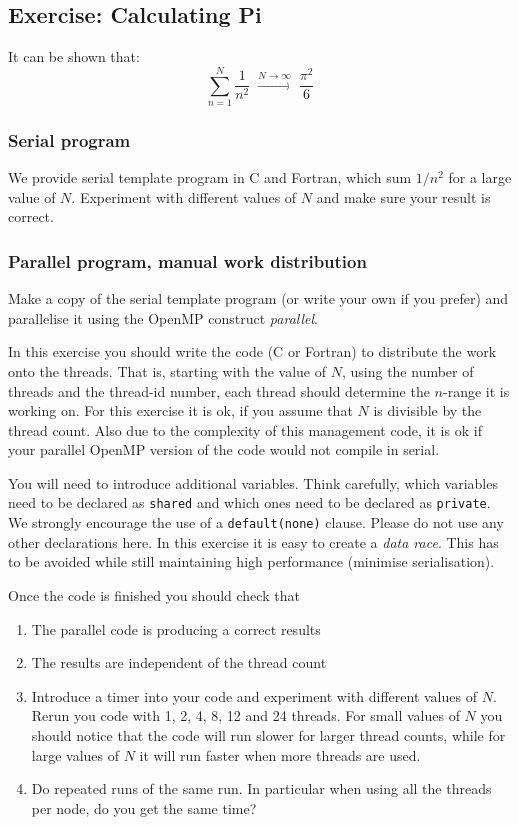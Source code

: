 \subsection{Exercise: Calculating Pi} \label{calcPiAtomicExercise}
It can be shown that:
\begin{equation}
\sum_{n=1}^N \frac{1}{n^2} \;\stackrel{N \to \infty}{\longrightarrow}
\;\frac{\pi^2}{6}
\end{equation}

\subsubsection{Serial program}
We provide serial template program in C and Fortran, which sum $1/n^2$ for a large value of $N$.  Experiment with different values of $N$ and make sure your result is correct.

\subsubsection{Parallel program, manual work distribution}\label{PiManual}
Make a copy of the serial template program (or write your own if you prefer) and parallelise it using the OpenMP construct \textit{parallel}.  

In this exercise you should write the code (C or Fortran) to distribute the work onto the threads. That is, starting with the value of $N$, using the number of threads and the thread-id number, each thread should determine the $n$-range it is working on.  For this exercise it is ok, if you assume that $N$ is divisible by the thread count.  Also due to the complexity of this management code, it is ok if your parallel OpenMP version of the  code would not compile in serial.

You will need to introduce additional variables.  Think carefully, which variables need to be declared as \texttt{shared} and which ones need to be declared as \texttt{private}.  We strongly encourage the use of a \verb+default(none)+ clause.  Please do not use any other declarations here.  In this exercise it is easy to create a \textit{data race}.  This has to be avoided while still maintaining high performance (minimise serialisation).

Once the code is finished you should check that 
\begin{enumerate}
\item The parallel code is producing a correct results
\item The results are independent of the thread count
\item Introduce a timer into your code and experiment with different values of $N$.  Rerun you code with 1, 2, 4, 8, 12 and 24 threads.  For small values of $N$ you should notice that the code will run slower for larger thread counts, while for large values of $N$ it will run faster when more threads are used.
\item \label{runtimePi} Do repeated runs of the same run. In particular when using all the threads per  node, do you get the same time?
\end{enumerate}
